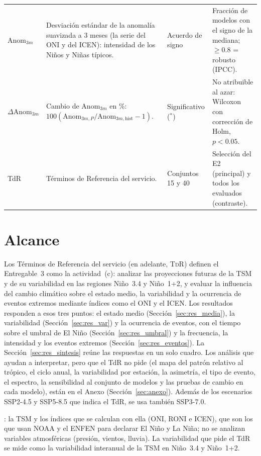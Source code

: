 \documentclass[11pt,a4paper]{article}
\begin{document}
\begin{table}[H]
\begin{tabular}{@{}L{2.0cm}L{\textwidth-2.0cm-5\tabcolsep\relax}|L{2.0cm}L{\textwidth-2.0cm-5\tabcolsep\relax}@{}}
$\mathrm{Anom}_{3m}$ & Desviación estándar de la anomalía suavizada a 3 meses (la serie del ONI y del ICEN): intensidad de los Niños y Niñas típicos. & Acuerdo de signo & Fracción de modelos con el signo de la mediana; $\geq 0.8$ = robusto (IPCC). \\
$\Delta\mathrm{Anom}_{3m}$ & Cambio de $\mathrm{Anom}_{3m}$ en \%: $100(\mathrm{Anom}_{3m,P}/\mathrm{Anom}_{3m,\mathrm{hist}}-1)$. & Significativo ($^{*}$) & No atribuible al azar: Wilcoxon con corrección de Holm, $p<0.05$. \\
TdR & Términos de Referencia del servicio. & Conjuntos 15 y 40 & Selección del E2 (principal) y todos los evaluados (contraste). \\
\bottomrule
\end{tabular}
\end{table}

\clearpage
\section{Alcance}
\label{sec:alcance}

Los Términos de Referencia del servicio (en adelante, \textsc{TdR}) definen el Entregable~3 como la actividad~(c): analizar las proyecciones futuras de la TSM y de su variabilidad en las regiones Niño~3.4 y Niño~1+2, y evaluar la influencia del cambio climático sobre el estado medio, la variabilidad y la ocurrencia de eventos extremos mediante índices como el ONI y el ICEN. Los resultados responden a esos tres puntos: el estado medio (Sección~\ref{sec:res_media}), la variabilidad (Sección~\ref{sec:res_var}) y la ocurrencia de eventos, con el tiempo sobre el umbral de El Niño (Sección~\ref{sec:res_umbral}) y la frecuencia, la intensidad y los eventos extremos (Sección~\ref{sec:res_eventos}). 
La Sección~\ref{sec:res_sintesis} reúne las respuestas en un solo cuadro. Los análisis que ayudan a interpretar, pero que el TdR no pide (el mapa del patrón relativo al trópico, el ciclo anual, la variabilidad por estación, la asimetría, el tipo de evento, el espectro, la sensibilidad al conjunto de modelos y las pruebas de cambio en cada modelo), están en el Anexo (Sección~\ref{sec:anexo}). Además de los escenarios SSP2-4.5 y SSP5-8.5 que indica el TdR, se usa también SSP3-7.0.

: la TSM y los índices que se calculan con ella (ONI, RONI e ICEN), que son los que usan NOAA y el ENFEN para declarar El Niño y La Niña; no se analizan variables atmosféricas (presión, vientos, lluvia). La variabilidad que pide el TdR se mide como la variabilidad interanual de la TSM en Niño~3.4 y Niño~1+2.
\end{document}
